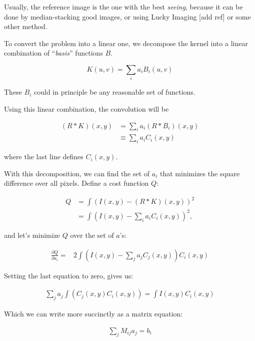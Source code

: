 Usually, the reference image is the one with the best {\em seeing}, 
because it can be done by median-stacking good images, or using Lucky Imaging [add ref] or some other method.

To convert the problem into a linear one, we decompose the kernel into a linear combination of ``{\em basis}'' functions $B$.

\begin{equation} \label{kernel_linear}
K(u,v) = \sum_{i} a_{i} B_{i}(u,v)
\end{equation}

These $B_{i}$ could in principle be any reasonable set of functions. 

Using this linear combination, the convolution will be

\begin{align}
(R \mathbin{*} K)(x,y) & = \sum_{i} a_{i} \left( R \mathbin{*} B_{i} \right)(x,y) \\
 & \equiv \sum_{i} a_{i} C_{i}(x,y)
\end{align}

where the last line defines $C_{i}(x,y)$.

With this decomposition, we can find the set of $a_{i}$ that minimizes the square difference over all pixels.
Define a cost function $Q$:

\begin{align}
Q &= \int \left( I(x,y) - (R \mathbin{*} K)(x,y) \right)^2 \\
 & = \int \left( I(x,y) - \sum_{i} a_{i} C_{i}(x,y) \right)^2,
\end{align}

and let's minimize $Q$ over the set of $a$'s:

\begin{align}
\frac{\partial Q}{\partial a_{i}} = & 2 \int \left( I(x,y) - \sum_{j} a_{j} C_{j}(x,y) \right) C_{i}(x,y) 
\end{align}

Setting the last equation to zero, gives us:

\begin{align}
\sum_{j} a_{j} \int \left( C_{j}(x,y)  C_{i}(x,y) \right) =  \int I(x,y) C_{i}(x,y) 
\end{align}

Which we can write more succinctly as a matrix equation:

\begin{align} \label{matrix_eq}
\sum_{j} M_{ij} a_{j}  =  b_{i}
\end{align}


